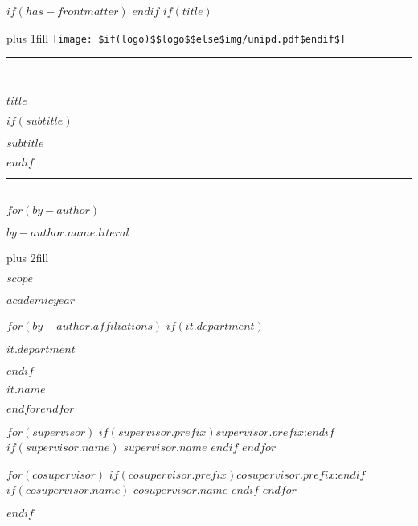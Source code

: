 $if(has-frontmatter)$
\frontmatter
$endif$
$if(title)$
\cleardoublepage
\thispagestyle{empty}
{\centering
\hbox{}\vskip 0cm plus 1fill
\texttt{[image: \$if(logo)\$\$logo\$\$else\$img/unipd.pdf\$endif\$]}\\
\vspace{5ex}
\rule{\linewidth}{0.4 mm} \\
{\huge\bfseries $title$ \par}
$if(subtitle)$
\vspace{3ex}
{\large\bfseries $subtitle$ \par}
$endif$
\rule{\linewidth}{0.4 mm} \\
\vspace{12ex}
$for(by-author)$
{\Large\bfseries $by-author.name.literal$ \par}
\vspace{3ex}
\vskip 0cm plus 2fill
{\bfseries\large $scope$ \par}
\vspace{3ex}
{\bfseries\large $academicyear$ \par}
\vspace{12ex}
$for(by-author.affiliations)$%
$if(it.department)$%
{\bfseries\large $it.department$ \par}
\vspace{3ex}
$endif$%
{\bfseries\large $it.name$ \par}
$endfor$$endfor$%
\vspace{12ex}
{\small $for(supervisor)$ $if(supervisor.prefix)$\textbf{$supervisor.prefix$}:$endif$ $if(supervisor.name)$ $supervisor.name$ $endif$ $endfor$\par}
{\small $for(cosupervisor)$ $if(cosupervisor.prefix)$\textbf{$cosupervisor.prefix$}:$endif$ $if(cosupervisor.name)$ $cosupervisor.name$ $endif$ $endfor$\par}
}
\newpage
$endif$